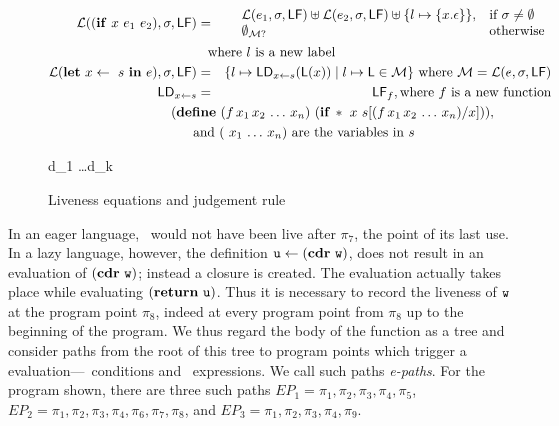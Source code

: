 \documentclass[10pt]{sigplanconf}
\begin{document}
\begin{figure*}[t]
\begin{eqnarray*}
\mathcal{L}((\SIF~x~e_1~e_2),\sigma,\Lfonly) &=&
        \begin{array}{l l}
                    \mathcal{L}(e_1,\sigma,\Lfonly) \uplus
        \mathcal{L}(e_2,\sigma,\Lfonly) \uplus
        \{l \mapsto  \{x.\epsilon\}\},  & \mbox{if}~\sigma \ne \emptyset\\
        \emptyset_{\cal{M}?}  & \mbox{otherwise}
                 \end{array} \\
 \makebox[0mm]{\hspace*{3.8cm} where $l$ is a new label}\\
\mathcal{L}(\LET~x \leftarrow~s~\IN~e),\sigma,\Lfonly) &=&
        \{ l \mapsto \Ldonly_{x \leftarrow s}(\Lv(x)) \mid l \mapsto \Lv
        \in \mathcal{M}\}
\mbox{ where } \mathcal{M} = \mathcal{L}(e,\sigma,\Lfonly)\\
\Ldonly_{x \leftarrow s} &=& \Lfonly_f, \mbox{where}~f~\mbox{is a new function}\\
 \makebox[0mm]{\hspace*{7cm}   
 $(\DEFINE~(f\,x_1\,x_2\, \ldots \, x_n)~(\SIF\,*~x~s[(f\,x_1\,
           x_2\, \ldots\, x_n)/x]))$,} \\
 \makebox[0mm]{\hspace*{5.5cm} and 
     $(\ x_1\, \ldots\, x_n)$ are the variables in $s$}
\end{eqnarray*}
\begin{minipage}{0.85\textwidth}
        { d_1 \ldots d_k \len \Lfonly
\\ }
\end{minipage}
  \caption{Liveness equations and judgement rule}\label{fig:live-judge}
\end{figure*}

In an eager language, \pw\ would not have been live after $\pi_7$, the
point of  its last  use. In a  lazy language, however,  the definition
$\mbox{\tt u}  \leftarrow (\mbox{$\mathbf{cdr}$}~\mbox{\tt w})$,  does  not result  in  an evaluation  of
$(\mbox{$\mathbf{cdr}$}~\mbox{\tt w})$; instead  a closure is created.   The evaluation actually
takes place while evaluating  $(\mbox{$\mathbf{ return}$}~\mbox{\tt u})$. Thus it is necessary to
record the liveness  of $\mbox{\tt w}$ at the program  point $\pi_8$, indeed at
every program point from $\pi_8$ up to the beginning of the program.
  We thus regard the body of the function as a tree and consider paths
  from  the  root of  this  tree to  program  points  which trigger  a
  evaluation---\SIF\  conditions and  \RETURN\  expressions.  We  call
  such paths  {\em e-paths}.  For  the program shown, there  are three
  such  paths $EP_1  = \pi_1,  \pi_2,  \pi_3, \pi_4,  \pi_5$, $EP_2  =
  \pi_1, \pi_2, \pi_3, \pi_4, \pi_6, \pi_7, \pi_8$, and $EP_3 = \pi_1,
  \pi_2, \pi_3, \pi_4, \pi_9$.
\end{document}
